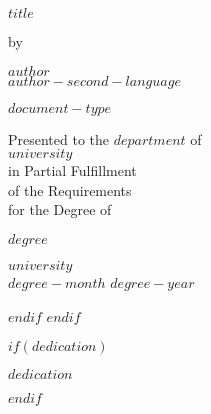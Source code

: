 \documentclass[letterpaper, $if(page-layout)$$page-layout$$else$nobind$endif$]{templates/ociamthesis}
\begin{document}
\begin{romanpages}
\newpage
\thispagestyle{empty} %
\begin{center}
  
  \begin{spacing}{2}
    {\Large{\textbf{$title$}}}
  \end{spacing}
  
  \vspace*{24pt}

  \begin{spacing}{1.4}
    by\\
    
    \vspace*{24pt}
    
    {\Large{\textbf{
      $author$\\
      \vspace*{10pt}
      {\Huge {\secondlanguage $author-second-language$}}
    }}}
    
    \vspace*{72pt}
    
    {\Large{\textbf{$document-type$}}}\\
    
    \vspace*{24pt}
    
    Presented to the $department$ of\\
    $university$\\
    in Partial Fulfillment\\
    of the Requirements\\
    for the Degree of\\
    
    \vspace*{30pt}
    
    {\Large{\textbf{$degree$}}}\\
    
    \vfill

    {\large{$university$\\
    $degree-month$ $degree-year$}}

  \end{spacing}
\end{center}



$endif$
$endif$

$if(dedication)$
\begin{dedication}
  $dedication$
\end{dedication}
$endif$


\end{romanpages}
\end{document}
